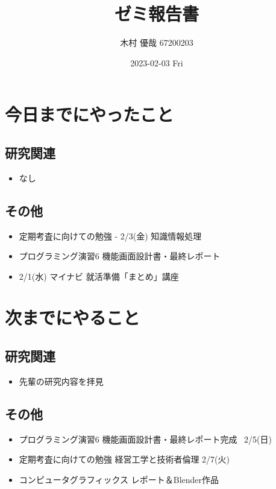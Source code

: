 \documentclass[uplatex, onecolumn, 10pt]{jsarticle}
\begin{document}
\title{\vspace{-40mm}\bf{\LARGE{ゼミ報告書}}}
\author{\vspace{-40mm}木村 優哉 67200203}
\date{2023-02-03 Fri}
\maketitle


\section{今日までにやったこと}

\subsection*{研究関連}
\begin{itemize}
	\item なし
\end{itemize}

\subsection*{その他}
\begin{itemize}
	\item 定期考査に向けての勉強 - 2/3(金) 知識情報処理
	\item プログラミング演習6 機能画面設計書・最終レポート
	\item 2/1(水) マイナビ 就活準備「まとめ」講座
\end{itemize}


\section{次までにやること}

\subsection*{研究関連}
\begin{itemize}
	\item 先輩の研究内容を拝見
\end{itemize}

\subsection*{その他}
\begin{itemize}
	\item プログラミング演習6 機能画面設計書・最終レポート完成 ~2/5(日)
	\item 定期考査に向けての勉強 経営工学と技術者倫理 2/7(火)
	\item コンピュータグラフィックス レポート＆Blender作品
\end{itemize}
\end{document}
